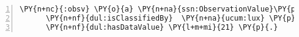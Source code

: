 \expandafter\def\csname PY@tok@err\endcsname{}
{\small
\begin{Verbatim}[commandchars=\\\{\},numbers=left,firstnumber=1,stepnumber=1]
\PY{n+nc}{:obsv} \PY{o}{a} \PY{n+na}{ssn:ObservationValue}\PY{p}{,} \PY{n+na}{frap:Preference} \PY{p}{;}
      \PY{n+nf}{dul:isClassifiedBy}  \PY{n+na}{ucum:lux} \PY{p}{;}
      \PY{n+nf}{dul:hasDataValue} \PY{l+m+mi}{21} \PY{p}{.}
\end{Verbatim}
}
